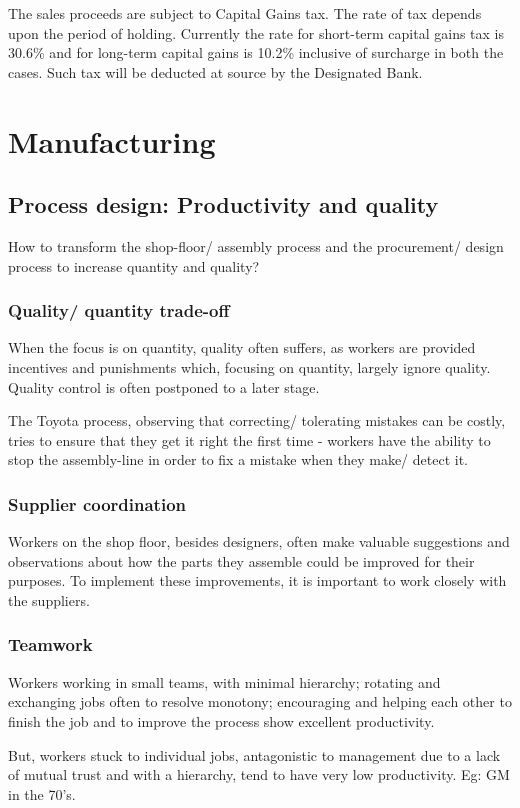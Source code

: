 \documentclass[oneside, article]{memoir}
\begin{document}
\subitem The sales proceeds are subject to Capital Gains tax. The rate of tax depends upon the period of holding. Currently the rate for short-term capital gains tax is 30.6\% and for long-term capital gains is 10.2\% inclusive of surcharge in both the cases. Such tax will be deducted at source by the Designated Bank.

\chapter{Manufacturing}
\section{Process design: Productivity and quality}
How to transform the shop-floor/ assembly process and the procurement/ design process to increase quantity and quality?

\subsection{Quality/ quantity trade-off}
When the focus is on quantity, quality often suffers, as workers are provided incentives and punishments which, focusing on quantity, largely ignore quality. Quality control is often postponed to a later stage.

The Toyota process, observing that correcting/ tolerating mistakes can be costly, tries to ensure that they get it right the first time - workers have the ability to stop the assembly-line in order to fix a mistake when they make/ detect it.

\subsection{Supplier coordination}
Workers on the shop floor, besides designers, often make valuable suggestions and observations about how the parts they assemble could be improved for their purposes. To implement these improvements, it is important to work closely with the suppliers.

\subsection{Teamwork}
Workers working in small teams, with minimal hierarchy; rotating and exchanging jobs often to resolve monotony; encouraging and helping each other to finish the job and to improve the process show excellent productivity.

But, workers stuck to individual jobs, antagonistic to management due to a lack of mutual trust and with a hierarchy, tend to have very low productivity. Eg: GM in the 70's.
\end{document}
